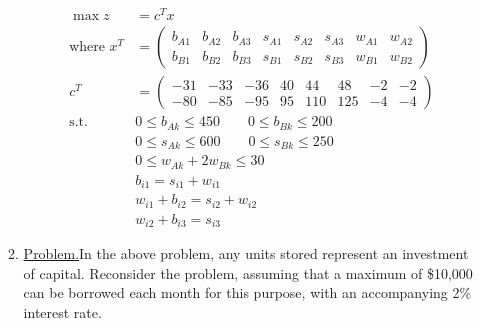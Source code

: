 \documentclass{homework}
\newcommand{\st}{\mathrm{s.t.}}
\begin{document}
\begin{enumerate}
\begin{enumerate}
			\begin{tcolorbox}
				\vspace{-1em}
				\begin{align*}
					\max z & = c^T x \\
					\text{where } x^T & = \begin{pmatrix}
						b_{A1}  & b_{A2} & b_{A3} & s_{A1} & s_{A2} & s_{A3} & w_{A1} & w_{A2} \\
						b_{B1}  & b_{B2} & b_{B3} & s_{B1} & s_{B2} & s_{B3} & w_{B1} & w_{B2}
					\end{pmatrix} \\
				c^T & = \begin{pmatrix}
					-31 & -33 & -36 & 40 & 44 & 48 & -2 & -2 \\
					-80 & -85 & -95 & 95 & 110 & 125 & -4 & -4
				\end{pmatrix} \\
				\st \qquad &	0 \le b_{Ak} \le 450  \qquad 0 \le b_{Bk} \le 200 \\
				& 0 \le s_{Ak} \le 600 \qquad 0 \le s_{Bk} \le 250 \\
				& 0 \le w_{Ak} + 2 w_{Bk} \le 30 \\
			 & b_{i1}  = s_{i1} + w_{i1} \\
				& w_{i1} + b_{i2} = s_{i2} + w_{i2} \\
				& w_{i2} + b_{i3}  = s_{i3}
				\end{align*}
				
			\end{tcolorbox}
		
			\pagebreak
			
			\item \underline{Problem.}\quad In the above problem, any units stored represent an investment of capital. Reconsider the problem, assuming that a maximum of \$10,000 can be borrowed each month for this purpose, with an accompanying 2\% interest rate.
			

\end{enumerate}
\end{enumerate}
\end{document}

